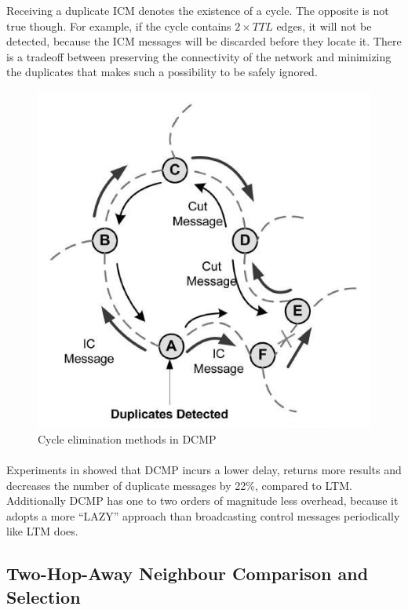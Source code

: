 \documentclass[a4paper,10pt]{article}
\begin{document}
Receiving a duplicate ICM denotes the existence of a cycle. The opposite is not true though. For example, if the cycle contains $2 \times TTL$ edges, it will not be detected, because the ICM messages will be discarded before they locate it. There is a tradeoff between preserving the connectivity of the network and minimizing the duplicates that makes such a possibility to be safely ignored.

\begin{figure}
\centering
  \includegraphics[scale=0.4]{img/dcmp.jpeg}
\caption{Cycle elimination methods in DCMP}
\label{figure:dcmp}
\end{figure}

\paragraph{}
Experiments in \cite{zhu_dcmp_2008} showed that DCMP incurs a lower delay, returns more results and decreases the number of duplicate messages by 22\%, compared to LTM. Additionally DCMP has one to two orders of magnitude less overhead, because it adopts a more ``LAZY'' approach than broadcasting control messages periodically like LTM does.

\subsection{Two-Hop-Away Neighbour Comparison and Selection}
\end{document}
